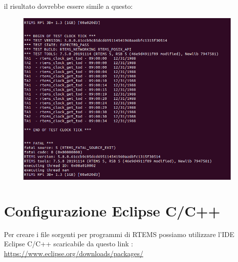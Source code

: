 \documentclass[12pt, a4paper]{article}
\begin{document}
\begin{flushleft}
il risultato dovrebbe essere simile a questo:
\begin{figure}[h!]
\includegraphics[width=\linewidth]{risultato-ticker.png}
\end{figure}

\newpage
\section{Configurazione Eclipse C/C++} 
Per creare i file sorgenti per programmi di RTEMS possiamo utilizzare l'IDE Eclipse C/C++ scaricabile da questo link :
\url{https://www.eclipse.org/downloads/packages/}



\end{flushleft}
\end{document}

